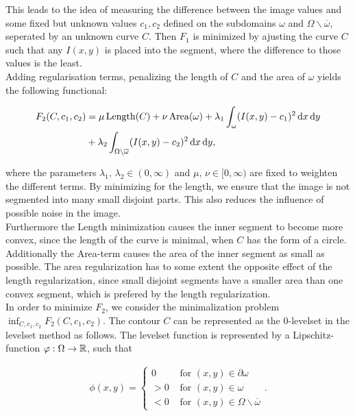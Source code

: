 This leads to the idea of measuring the difference between the image values and some fixed but unknown values $c_1,c_2$ defined on the subdomains $\omega$ and $\Omega\backslash \overline{\omega}$, seperated by an unknown curve $C$. Then $F_1$ is minimized by ajusting the curve $C$ such that any $I(x,y)$ is placed into the segment, where the difference to those values is the least.\\

Adding regularisation terms, penalizing the length of $C$ and the area of $\omega$ yields the following functional:

\begin{equation}
  \begin{split}
    F_2(C,c_1,c_2) &= \mu\,{\rm Length}(C) + \nu\,{\rm Area}(\omega) + \lambda_1\int_{\omega}(I(x,y)-c_1)^2 \df x \df y\\
    &+ \lambda_2\int_{\Omega\backslash\overline{\omega}} (I(x,y)-c_2)^2 \df x \df y,
  \end{split}\label{F1}
\end{equation}

where the parameters $\lambda_1,\,\lambda_2\in (0,\infty)$ and $\mu,\,\nu\in [0,\infty)$ are fixed to weighten the different terms. By minimizing for the length, we ensure that the image is not segmented into many small disjoint parts. This also reduces the influence of possible noise in the image.\\
Furthermore the Length minimization causes the inner segment to become more convex, since the length of the curve is minimal, when $C$ has the form of a circle.\\
Additionally the Area-term causes the area of the inner segment as small as possible. The area regularization has to some extent the opposite effect of the length regularization, since small disjoint segments have a smaller area than one convex segment, which is prefered by the length regularization.\\

In order to minimize $F_2$, we consider the minimalization problem $\inf_{C,c_1,c_2}F_2(C,c_1,c_2)$. The contour $C$ can be represented as the $0$-levelset in the levelset method as follows. The levelset function is represented by a Lipschitz-function $\varphi:\Omega\to\mathbb R$, such that

\begin{align*}
  \phi(x,y) = 
  \begin{cases}
    0 & \mbox{ for } (x,y) \in \partial\omega\\
    > 0 & \mbox{ for } (x,y) \in \omega\\
    < 0 & \mbox{ for } (x,y) \in \Omega\backslash\overline{\omega}
  \end{cases}.
\end{align*}

